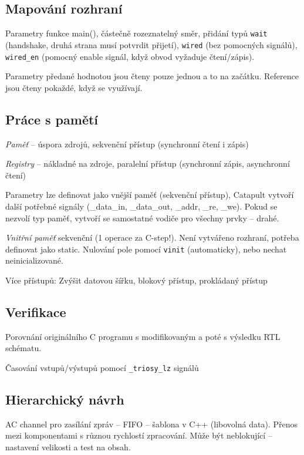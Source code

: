 \documentclass[a4paper, 11pt]{report}
\begin{document}
\subsection{Mapování rozhraní}
Parametry funkce main(), částečně rozeznatelný směr, přidání typů \texttt{wait} (handshake, druhá strana musí potvrdit přijetí), \texttt{wired} (bez pomocných signálů), \texttt{wired\_en} (pomocný enable signál, když obvod vyžaduje čtení/zápis).

Parametry předané hodnotou jsou čteny pouze jednou a to na začátku. Reference jsou čteny pokaždé, když se využívají.

\subsection{Práce s pamětí}

\emph{Paměť} -- úspora zdrojů, sekvenční přístup (synchronní čtení i zápis)

\emph{Registry} -- nákladné na zdroje, paralelní přístup (synchronní zápis, asynchronní čtení)

Parametry lze definovat jako vnější paměť (sekvenční přístup), Catapult vytvoří další potřebné signály (\_data\_in, \_data\_out, \_addr, \_re, \_we). Pokud se nezvolí typ paměť, vytvoří se samostatné vodiče pro všechny prvky -- drahé.

\emph{Vnitřní paměť} sekvenční (1 operace za C-step!). Není vytvářeno rozhraní, potřeba definovat jako static. Nulování pole pomocí \texttt{vinit} (automaticky), nebo nechat neinicializované.

Více přístupů: Zvýšit datovou šířku, blokový přístup, prokládaný přístup

\subsection{Verifikace}
Porovnání originálního C programu s modifikovaným a poté s výsledku RTL schématu.

Časování vstupů/výstupů pomocí \texttt{\_triosy\_lz} signálů

\subsection{Hierarchický návrh}
AC channel pro zasílání zpráv -- FIFO -- šablona v C++ (libovolná data). Přenos mezi komponentami s různou rychlostí zpracování. Může být neblokující -- nastavení velikosti a test na obsah.
\end{document}
